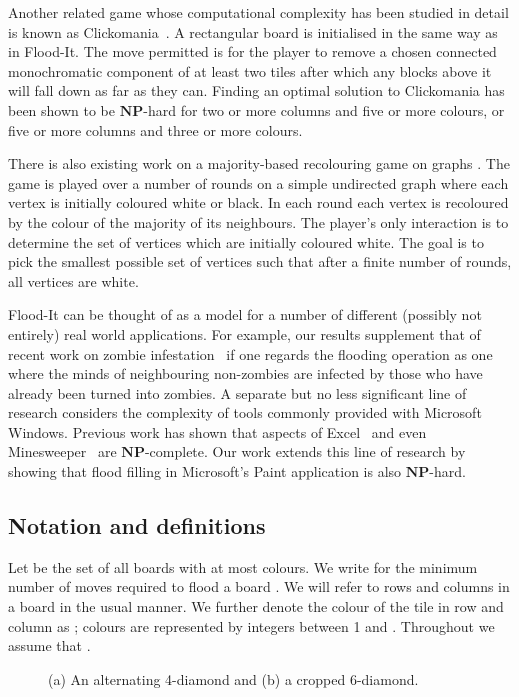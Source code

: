\documentclass[a4paper,11pt]{llncs}
\newcommand{\pgfgraphic}[1]{}
\newcounter{l}
\newcommand{\NPtime}{\ensuremath{\mathbf{NP}}}
\newcommand{\recdim}[2]{}
\begin{document}
Another related game whose computational complexity has been studied in detail is known as Clickomania~\cite{BDDFJM2002:Click}.  A rectangular board is initialised in the same way as in Flood-It. The move permitted is for the player to remove a chosen connected monochromatic component of at least two tiles after which any blocks above it will fall down as far as they can. Finding an optimal solution to Clickomania has been shown to be \NPtime-hard for two or more columns and five or more colours, or five or more columns and three or more colours.

There is also existing work on a majority-based recolouring game on graphs \cite{Berger:2001,Flocchini:2003,Peleg:1998}. The game is played over a number of rounds on a simple undirected graph where each vertex is initially coloured white or black. In each round each vertex is recoloured by the colour of the majority of its neighbours. The player's only interaction is to determine the set of vertices which are initially coloured white. The goal is to pick the smallest possible set of vertices such that after a finite number of rounds, all vertices are white.


Flood-It can be thought of as a model for a number of different (possibly not entirely) real world applications.  For example, our results supplement that of recent work on zombie infestation~\cite{MHIS2009:Zombies} if one regards the flooding operation as one where the minds of neighbouring non-zombies are infected by those who have already been turned into zombies.  A separate but no less significant line of research considers the complexity of tools commonly provided with Microsoft Windows. Previous work has shown that aspects of Excel~\cite{IMO2009:Draw} and even Minesweeper~\cite{Kaye2000:Minesweeper} are \NPtime-complete. Our work extends this line of research by showing that flood filling in Microsoft's Paint application is also \NPtime-hard.

\subsection{Notation and definitions}

Let  be the set of all \recdim{n}{n} boards with at most  colours. We write  for the minimum number of moves required to flood a board . We will refer to rows and columns in a board in the usual manner. We further denote the colour of the tile in row  and column  as ; colours are represented by integers between 1 and . Throughout we assume that .
\begin{figure}[t] \centering

        \centering
        \pgfgraphic{graphic-diamonds}
        \caption{(a) An alternating 4-diamond and (b) a cropped 6-diamond.\label{fig:kdiamonds}}
\end{figure}
\end{document}
